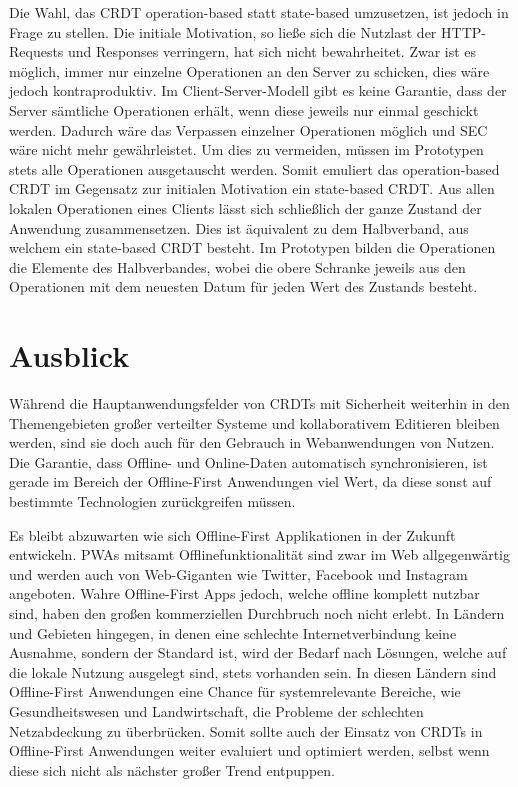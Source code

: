 \documentclass[a4paper, 12pt]{scrreprt}
\begin{document}
Die Wahl, das CRDT operation-based statt state-based umzusetzen, ist jedoch in Frage zu stellen. Die initiale Motivation, so ließe sich die Nutzlast der HTTP-Requests und Responses verringern, hat sich nicht bewahrheitet. Zwar ist es möglich, immer nur einzelne Operationen an den Server zu schicken, dies wäre jedoch kontraproduktiv. Im Client-Server-Modell gibt es keine Garantie, dass der Server sämtliche Operationen erhält, wenn diese jeweils nur einmal geschickt werden. Dadurch wäre das Verpassen einzelner Operationen möglich und \ac{SEC} wäre nicht mehr gewährleistet. Um dies zu vermeiden, müssen im Prototypen stets alle Operationen ausgetauscht werden. Somit emuliert das operation-based CRDT im Gegensatz zur initialen Motivation ein state-based CRDT. Aus allen lokalen Operationen eines Clients lässt sich schließlich der ganze Zustand der Anwendung zusammensetzen. Dies ist äquivalent zu dem Halbverband, aus welchem ein state-based CRDT besteht. Im Prototypen bilden die Operationen die Elemente des Halbverbandes, wobei die obere Schranke jeweils aus den Operationen mit dem neuesten Datum für jeden Wert des Zustands besteht.

\section{Ausblick}

Während die Hauptanwendungsfelder von CRDTs mit Sicherheit weiterhin in den Themengebieten großer verteilter Systeme und kollaborativem Editieren bleiben werden, sind sie doch auch für den Gebrauch in Webanwendungen von Nutzen. Die Garantie, dass Offline- und Online-Daten automatisch synchronisieren, ist gerade im Bereich der Offline-First Anwendungen viel Wert, da diese sonst auf bestimmte Technologien zurückgreifen müssen.

Es bleibt abzuwarten wie sich Offline-First Applikationen in der Zukunft entwickeln. PWAs mitsamt Offlinefunktionalität sind zwar im Web allgegenwärtig und werden auch von Web-Giganten wie Twitter, Facebook und Instagram angeboten. Wahre Offline-First Apps jedoch, welche offline komplett nutzbar sind, haben den großen kommerziellen Durchbruch noch nicht erlebt. In Ländern und Gebieten hingegen, in denen eine schlechte Internetverbindung keine Ausnahme, sondern der Standard ist, wird der Bedarf nach Lösungen, welche auf die lokale Nutzung ausgelegt sind, stets vorhanden sein. In diesen Ländern sind Offline-First Anwendungen eine Chance für systemrelevante Bereiche, wie Gesundheitswesen und Landwirtschaft, die Probleme der schlechten Netzabdeckung zu überbrücken. Somit sollte auch der Einsatz von CRDTs in Offline-First Anwendungen weiter evaluiert und optimiert werden, selbst wenn diese sich nicht als nächster großer Trend entpuppen. 
\end{document}
